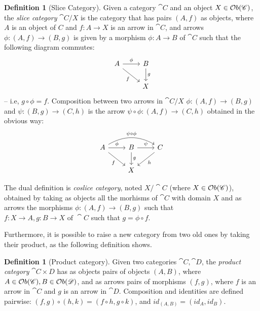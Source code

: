 \documentclass[a4paper, twoside,openright]{report}
\theoremstyle{plain}
\theoremstyle{definition}
\newtheorem{definition}[theorem]{Definition}
\begin{document}
\begin{definition}[Slice Category]\label{def:slice_cat}
    Given a category $\cat{C}$ and an object $X \in \mathcal{O}b(\mathscr{C})$, the \emph{slice category} $\cat{C}/X$ is the category that has pairs $(A, f)$ as objects, where $A$ is an object of $C$ and $f: A \rightarrow X$ is an arrow in $\cat{C}$, and arrows $\phi: (A, f) \rightarrow (B, g)$ is given by a morphism $\phi: A \rightarrow B$ of $\cat{C}$ such that the following diagram commutes:
    \[
        \begin{tikzcd}
            A \arrow[r, "{\phi}"] \arrow[dr, "f" swap] & B \arrow[d, "g"] \\
            & X
        \end{tikzcd}
    \]
    -- i.e, $g \circ \phi = f$.
    Composition between two arrows in $\cat{C}/X$ $\phi: (A, f) \rightarrow (B, g)$ and $\psi: (B, g) \rightarrow (C, h)$ is the arrow $\psi \circ \phi : (A, f) \rightarrow (C, h)$ obtained in the obvious way:
    \[
        \begin{tikzcd}
            A \arrow[bend left=30]{rr}{\psi \circ \phi}  \arrow[r, "{\phi}"] \arrow[dr, "f" swap] & B \arrow[r, "{\psi}"] \arrow[d, "g"] & C \arrow[dl, "h"] \\
            & X & 
        \end{tikzcd}
    \]

    The dual definition is \emph{coslice category}, noted $X/\cat{C}$ (where $X \in \mathcal{O}b(\mathscr{C})$), obtained by taking as objects all the morhisms of $\cat{C}$ with domain $X$ and as arrows the morphisms $\phi: (A, f) \rightarrow (B, g)$ such that $f:X\rightarrow A, g:B \rightarrow X \text{ of }\cat{C}$ such that $g = \phi \circ f$. 
\end{definition}

Furthermore, it is possible to raise a new category from two old ones by taking their product, as the following definition shows.

\begin{definition}[Product category]
    Given two categories $\cat C, \cat D$, the \emph{product category} $\cat{C\times D}$ has as objects pairs of objects $(A, B)$, where $A \in \mathcal{O}b(\mathscr{C}), B \in \mathcal{O}b(\mathscr{D})$, and as arrows pairs of morphisms $(f, g)$, where $f$ is an arrow in $\cat C$ and $g$ is an arrow in $\cat D$. Composition and identities are defined pairwise: $(f, g) \circ (h, k) = (f \circ h, g \circ k)$, and $id_{(A, B)} = (id_A, id_B)$.

\end{definition}
\end{document}
